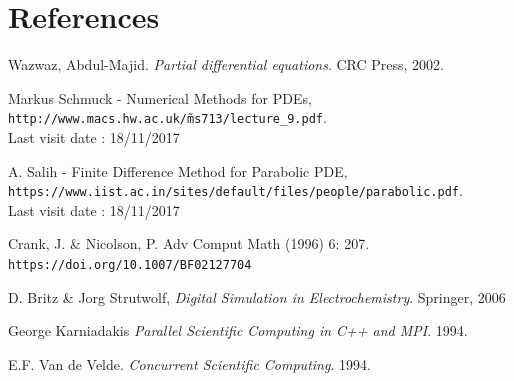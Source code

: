 \documentclass{article}
\begin{document}
        \section{References}
        \begin{thebibliography}{9}
            Wazwaz, Abdul-Majid. \textit{Partial differential equations}. CRC Press, 2002.
    
            Markus Schmuck - Numerical Methods for PDEs,
            \\\texttt{http://www.macs.hw.ac.uk/\~ms713/lecture\_9.pdf}.
            \\Last visit date : 18/11/2017
    
            A. Salih - Finite Difference Method for Parabolic PDE,
            \\\texttt{https://www.iist.ac.in/sites/default/files/people/parabolic.pdf}.
            \\Last visit date : 18/11/2017
    
            
            Crank, J. & Nicolson, P. Adv Comput Math (1996) 6: 207. 
            \\\texttt{https://doi.org/10.1007/BF02127704}
    
            D. Britz \& Jorg Strutwolf, \textit{Digital Simulation in Electrochemistry}.
            Springer, 2006

            George Karniadakis \textit{Parallel Scientific Computing in C++ and MPI}. 1994.

            E.F. Van de Velde. \textit{Concurrent Scientific Computing}. 1994.
    
            
            
        \end{thebibliography}
        \newpage
\end{document}
